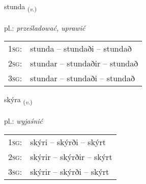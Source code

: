 \documentclass[frontgrid, backgrid]{flacards}\usepackage[]{graphicx}\usepackage[]{xcolor}
\begin{document}
\renewcommand{\flhead}{\vskip5pt \fboxsep=0pt {\small\bfseries\footnotesize Sagnorð | Verb}}
\renewcommand{\fcfoot}{\vskip5pt \fboxsep=0pt \hspace{2pt}{\small\bfseries\footnotesize 1K}}

\renewcommand{\blhead}{\vskip5pt {\small\bfseries\footnotesize Sagnorð | Verb }}
\renewcommand{\bcfoot}{\vskip5pt \hspace{2pt}{\small\bfseries\footnotesize 1K}}


{stunda \small{\textsubscript{(\textit{v.})}} \\[1ex] %
\textphonetic{[stʏnta]} \\
pl.: \emph{prześladować, uprawić} \\  [2ex]
\renewcommand*{\arraystretch}{0.8}
\begin{tabular}{p{1cm}l}
\textsc{1sg}: & stunda -- stundaði -- stundað \\ 
\textsc{2sg}: & stundar -- stundaðir -- stundað \\ 
\textsc{3sg}: & stundar -- stundaði -- stundað \\ 
\end{tabular}
}

\renewcommand{\flhead}{\vskip5pt \fboxsep=0pt {\small\bfseries\footnotesize Sagnorð | Verb}}
\renewcommand{\fcfoot}{\vskip5pt \fboxsep=0pt \hspace{2pt}{\small\bfseries\footnotesize 1K}}

\renewcommand{\blhead}{\vskip5pt {\small\bfseries\footnotesize Sagnorð | Verb }}
\renewcommand{\bcfoot}{\vskip5pt \hspace{2pt}{\small\bfseries\footnotesize 1K}}


{skýra \small{\textsubscript{(\textit{v.})}} \\[1ex] %
\textphonetic{[sciːra]} \\
pl.: \emph{wyjaśnić} \\  [2ex]
\renewcommand*{\arraystretch}{0.8}
\begin{tabular}{p{1cm}l}
\textsc{1sg}: & skýri -- skýrði -- skýrt \\ 
\textsc{2sg}: & skýrir -- skýrðir -- skýrt \\ 
\textsc{3sg}: & skýrir -- skýrði -- skýrt \\ 
\end{tabular}
}
\end{document}
